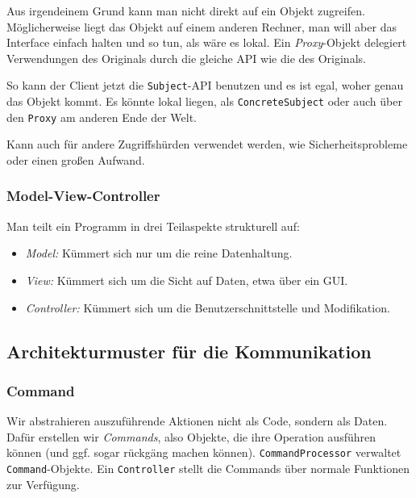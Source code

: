 \documentclass{panikzettel}
\begin{document}
Aus irgendeinem Grund kann man nicht direkt auf ein Objekt zugreifen. Möglicherweise liegt das Objekt auf einem anderen Rechner, man will aber das Interface einfach halten und so tun, als wäre es lokal. Ein \emph{Proxy}-Objekt delegiert Verwendungen des Originals durch die gleiche API wie die des Originals.

So kann der Client jetzt die \lstinline{Subject}-API benutzen und es ist egal, woher genau das Objekt kommt. Es könnte lokal liegen, als \lstinline{ConcreteSubject} oder auch über den \lstinline{Proxy} am anderen Ende der Welt.

Kann auch für andere Zugriffshürden verwendet werden, wie Sicherheitsprobleme oder einen großen Aufwand.

\subsubsection{Model-View-Controller}

Man teilt ein Programm in drei Teilaspekte strukturell auf: \begin{itemize}
\item \emph{Model:} Kümmert sich nur um die reine Datenhaltung.
\item \emph{View:} Kümmert sich um die Sicht auf Daten, etwa über ein GUI.
\item \emph{Controller:} Kümmert sich um die Benutzerschnittstelle und Modifikation. %
\end{itemize}

\subsection{Architekturmuster für die Kommunikation}

\subsubsection{Command}

Wir abstrahieren auszuführende Aktionen nicht als Code, sondern als Daten. Dafür erstellen wir \emph{Commands}, also Objekte, die ihre Operation ausführen können (und ggf. sogar rückgäng machen können). \lstinline{CommandProcessor} verwaltet \lstinline{Command}-Objekte. Ein \lstinline{Controller} stellt die Commands über normale Funktionen zur Verfügung.

\end{document}
